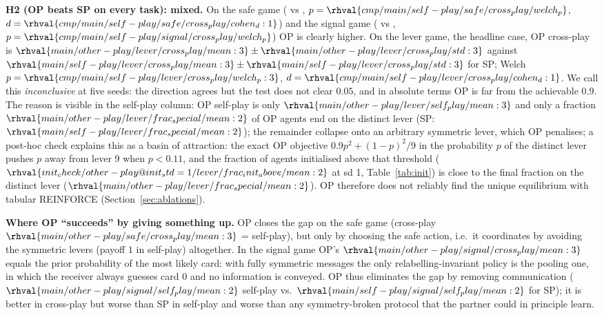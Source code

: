 \textbf{H2 (OP beats SP on every task): mixed.} On the safe game ( vs , $p=\rhval{cmp/main/self-play/safe/cross_play/welch_p}$, $d=\rhval{cmp/main/self-play/safe/cross_play/cohen_d:1}$) and the signal game ( vs , $p=\rhval{cmp/main/self-play/signal/cross_play/welch_p}$) OP is clearly higher. On the lever game, the headline case, OP cross-play is $\rhval{main/other-play/lever/cross_play/mean:3}\pm\rhval{main/other-play/lever/cross_play/std:3}$ against $\rhval{main/self-play/lever/cross_play/mean:3}\pm\rhval{main/self-play/lever/cross_play/std:3}$ for SP; Welch $p=\rhval{cmp/main/self-play/lever/cross_play/welch_p:3}$, $d=\rhval{cmp/main/self-play/lever/cross_play/cohen_d:1}$. We call this \emph{inconclusive} at five seeds: the direction agrees but the test does not clear $0.05$, and in absolute terms OP is far from the achievable $0.9$. The reason is visible in the self-play column: OP self-play is only $\rhval{main/other-play/lever/self_play/mean:3}$ and only a fraction $\rhval{main/other-play/lever/frac_special/mean:2}$ of OP agents end on the distinct lever (SP: $\rhval{main/self-play/lever/frac_special/mean:2}$); the remainder collapse onto an arbitrary symmetric lever, which OP penalises; a post-hoc check explains this as a basin of attraction: the exact OP objective $0.9p^2+(1-p)^2/9$ in the probability $p$ of the distinct lever pushes $p$ away from lever 9 when $p<0.11$, and the fraction of agents initialised above that threshold ($\rhval{init_check/other-play@init_std=1/lever/frac_init_above/mean:2}$ at sd 1, Table~\ref{tab:init}) is close to the final fraction on the distinct lever ($\rhval{main/other-play/lever/frac_special/mean:2}$). OP therefore does not reliably find the unique equilibrium with tabular REINFORCE (Section~\ref{sec:ablations}).

\textbf{Where OP ``succeeds'' by giving something up.} OP closes the gap on the safe game (cross-play $\rhval{main/other-play/safe/cross_play/mean:3}$ = self-play), but only by choosing the safe action, i.e.\ it coordinates by avoiding the symmetric levers (payoff $1$ in self-play) altogether. In the signal game OP's $\rhval{main/other-play/signal/cross_play/mean:3}$ equals the prior probability of the most likely card: with fully symmetric messages the only relabelling-invariant policy is the pooling one, in which the receiver always guesses card 0 and no information is conveyed. OP thus eliminates the gap by removing communication ($\rhval{main/other-play/signal/self_play/mean:2}$ self-play vs.\ $\rhval{main/self-play/signal/self_play/mean:2}$ for SP); it is better in cross-play but worse than SP in self-play and worse than any symmetry-broken protocol that the partner could in principle learn.

